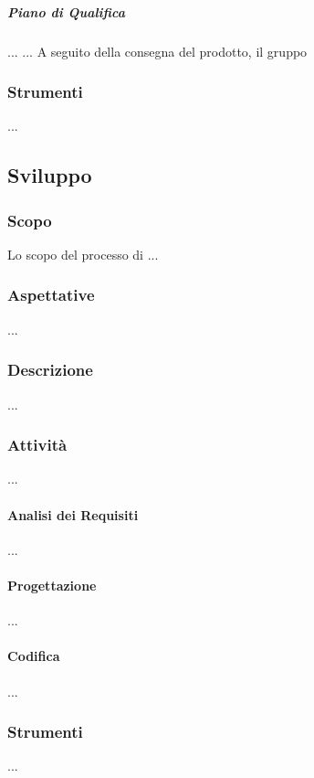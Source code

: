 
            \subparagraph{Piano di Qualifica}
                ...
            ...
            A seguito della consegna del prodotto, il gruppo \group
    \subsubsection{Strumenti}
        ...

\subsection{Sviluppo}
    \subsubsection{Scopo}
        Lo scopo del processo di ...
    \subsubsection{Aspettative}
        ...
    \subsubsection{Descrizione}
        ...
    \subsubsection{Attività}
        ...
        \paragraph{Analisi dei Requisiti}
            ...
        \paragraph{Progettazione}
            ...
        \paragraph{Codifica}
            ...
    \subsubsection{Strumenti}
        ...